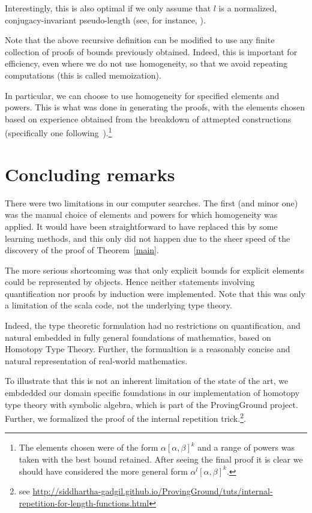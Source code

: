 \documentclass{amsart}
\theoremstyle{plain}
\theoremstyle{definition}
\theoremstyle{remark}
\begin{document}
Interestingly, this is also optimal if we only assume that $l$ is a normalized, conjugacy-invariant pseudo-length (see, for instance, \cite{gadgil}).

Note that the above recursive definition can be modified to use any finite collection of proofs of bounds previously obtained. Indeed, this is important for efficiency, even where we do not use homogeneity, so that we avoid repeating computations (this is called memoization).

In particular, we can choose to use homogeneity for specified elements and powers. This is what was done in generating the proofs, with the elements chosen based on experience obtained from the breakdown of attmepted  constructions (specifically one following~\cite{gadgil}).\footnote{The elements chosen were of the form $\alpha[\alpha, \beta]^k$ and a range of powers was taken with the best bound retained. After seeing the final proof it is clear we should have considered the more general form $\alpha^l[\alpha, \beta]^k$.}

\section{Concluding remarks}\label{S:Conclusions}

There were two limitations in our computer searches. The first (and minor one) was the manual choice of elements and powers for which homogeneity was applied. It would have been straightforward to have replaced this by some learning methods, and this only did not happen due to the sheer speed of the discovery of the proof of Theorem~\ref{main}.

The more serious shortcoming was that only explicit bounds for explicit elements could be represented by objects. Hence neither statements involving quantification nor proofs by induction were implemented. Note that this was only a limitation of the scala code, not the underlying type theory.

Indeed, the type theoretic formulation had no restrictions on quantification, and natural embedded in fully general foundations of mathematics, based on Homotopy Type Theory. Further, the formualtion is a reasonably concise and natural representation of real-world mathematics.

\renewcommand{\footnotesize}{\tiny}

To illustrate that this is not an inherent limitation of the state of the art, we embdedded our domain specific foundations in our implementation of homotopy type theory with symbolic algebra, which is part of the ProvingGround project. Further, we formalized the proof of the internal repetition trick.\footnote{see \href{http://siddhartha-gadgil.github.io/ProvingGround/tuts/internal-repetition-for-length-functions.html}{http://siddhartha-gadgil.github.io/ProvingGround/tuts/internal-repetition-for-length-functions.html}}.
\end{document}
